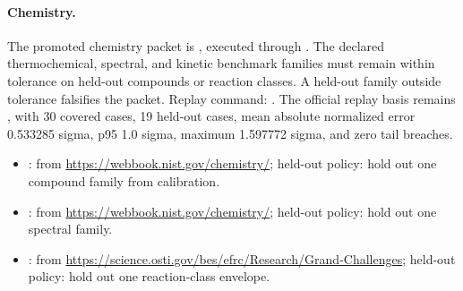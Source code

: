 \paragraph{Chemistry.}
The promoted chemistry packet is
, executed through
. The
declared thermochemical, spectral, and kinetic benchmark families must remain
within tolerance on held-out compounds or reaction classes. A held-out family
outside tolerance falsifies the packet. Replay command:
.
The official replay basis remains
, with 30 covered cases, 19 held-out
cases, mean absolute normalized error 0.533285 sigma, p95 1.0 sigma, maximum
1.597772 sigma, and zero tail breaches.
\begin{itemize}[leftmargin=1.5em,nosep]
\item {}:  from \url{https://webbook.nist.gov/chemistry/}; held-out policy: hold out one compound family from calibration.
\item {}:  from \url{https://webbook.nist.gov/chemistry/}; held-out policy: hold out one spectral family.
\item {}:  from \url{https://science.osti.gov/bes/efrc/Research/Grand-Challenges}; held-out policy: hold out one reaction-class envelope.
\end{itemize}

